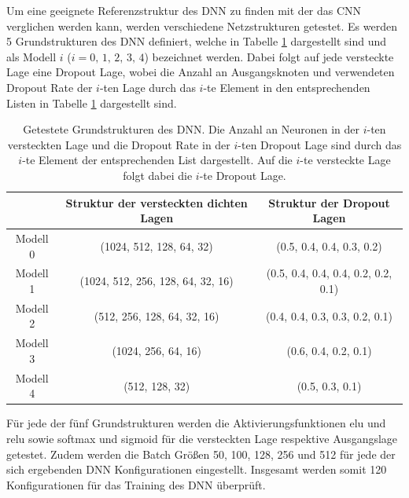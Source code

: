 Um eine geeignete Referenzstruktur des DNN zu finden mit der das CNN verglichen werden kann, werden verschiedene Netzstrukturen getestet. Es werden 5 Grundstrukturen des DNN definiert, welche in Tabelle \ref{tab:DNNstruk} dargestellt sind und als Modell $i$ ($i = 0,\,1,\,2,\,3,\,4$) bezeichnet werden. Dabei folgt auf jede versteckte Lage eine Dropout Lage, wobei die Anzahl an Ausgangsknoten und verwendeten Dropout Rate der $i$-ten Lage durch das $i$-te Element in den entsprechenden Listen in Tabelle \ref{tab:DNNstruk} dargestellt sind. \\
\captionsetup[table]{name=Tabelle}
\begin{table}[!b]
\centering
\caption{Getestete Grundstrukturen des DNN. Die Anzahl an Neuronen in der $i$-ten versteckten Lage und die Dropout Rate in der $i$-ten Dropout Lage sind durch das $i$-te Element der entsprechenden List dargestellt. Auf die $i$-te versteckte Lage folgt dabei die $i$-te Dropout Lage.}
\label{tab:DNNstruk}
 \begin{tabular}{c|c|c}
 & Struktur der versteckten dichten Lagen & Struktur der Dropout Lagen \\
 \hline
 Modell 0 & (1024, 512, 128, 64, 32) & (0.5, 0.4, 0.4, 0.3, 0.2) \\
 Modell 1 & (1024, 512, 256, 128, 64, 32, 16) & (0.5, 0.4, 0.4, 0.4, 0.2, 0.2, 0.1)\\
 Modell 2 & (512, 256, 128, 64, 32, 16) & (0.4, 0.4, 0.3, 0.3, 0.2, 0.1)\\
 Modell 3 & (1024, 256, 64, 16) & (0.6, 0.4, 0.2, 0.1)\\
 Modell 4 & (512, 128, 32) &  (0.5, 0.3, 0.1)\\
 \end{tabular}
\end{table}
Für jede der fünf Grundstrukturen werden die Aktivierungsfunktionen elu und relu sowie softmax und sigmoid für die versteckten Lage respektive Ausgangslage getestet. Zudem werden die Batch Größen 50, 100, 128, 256 und 512 für jede der sich ergebenden DNN Konfigurationen eingestellt. Insgesamt werden somit 120 Konfigurationen für das Training des DNN überprüft. \\
